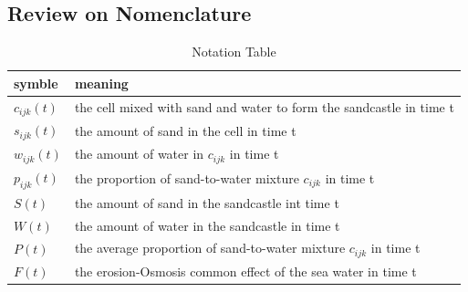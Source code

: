 \documentclass[12pt]{article}
\begin{document}
\subsection{Review on Nomenclature}
\begin{table}[H]
    \caption{Notation Table}
    \vspace{10pt}
    \centering
    \begin{tabular}{ |l| p{5cm}| } 
        \hline
        symble       & meaning                                                             \\
        \hline
        $c_{ijk}(t)$ & the cell mixed with sand and water to form the sandcastle in time t \\
        $s_{ijk}(t)$ & the amount of sand in the cell in time t                            \\
        $w_{ijk}(t)$ & the amount of water in  $c_{ijk}$ in time t                         \\
        $p_{ijk}(t)$ & the proportion of sand-to-water mixture $c_{ijk}$ in time t         \\
        $S(t)$       & the amount of sand in the sandcastle	int time t                      \\
        $W(t)$       & the amount of water in the sandcastle in time t                     \\
        $P(t)$       & the average proportion of sand-to-water mixture $c_{ijk}$ in time t \\
        $F(t)$       & the erosion-Osmosis common effect of the sea water in time t        \\
        \hline
    \end{tabular}
    \label{bs1}
\end{table}
\end{document}
